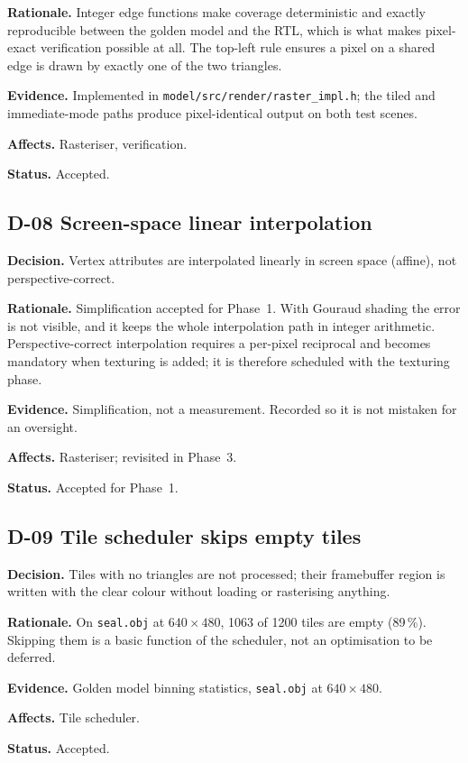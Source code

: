 \documentclass[11pt,a4paper]{article}
\newcommand{\field}[1]{\textbf{#1}\quad}
\begin{document}
\field{Rationale.} Integer edge functions make coverage deterministic and
exactly reproducible between the golden model and the RTL, which is what makes
pixel-exact verification possible at all. The top-left rule ensures a pixel on
a shared edge is drawn by exactly one of the two triangles.

\field{Evidence.} Implemented in
\texttt{model/src/render/raster\_impl.h}; the tiled and immediate-mode paths
produce pixel-identical output on both test scenes.

\field{Affects.} Rasteriser, verification.

\field{Status.} Accepted.

\subsection{D-08 \quad Screen-space linear interpolation}
\field{Decision.} Vertex attributes are interpolated linearly in screen space
(affine), not perspective-correct.

\field{Rationale.} Simplification accepted for Phase~1. With Gouraud shading the
error is not visible, and it keeps the whole interpolation path in integer
arithmetic. Perspective-correct interpolation requires a per-pixel reciprocal
and becomes mandatory when texturing is added; it is therefore scheduled with
the texturing phase.

\field{Evidence.} Simplification, not a measurement. Recorded so it is not
mistaken for an oversight.

\field{Affects.} Rasteriser; revisited in Phase~3.

\field{Status.} Accepted for Phase~1.

\subsection{D-09 \quad Tile scheduler skips empty tiles}
\field{Decision.} Tiles with no triangles are not processed; their framebuffer
region is written with the clear colour without loading or rasterising
anything.

\field{Rationale.} On \texttt{seal.obj} at $640\times480$, 1063 of 1200 tiles
are empty (89\,\%). Skipping them is a basic function of the scheduler, not an
optimisation to be deferred.

\field{Evidence.} Golden model binning statistics, \texttt{seal.obj} at
$640\times480$.

\field{Affects.} Tile scheduler.

\field{Status.} Accepted.
\end{document}
